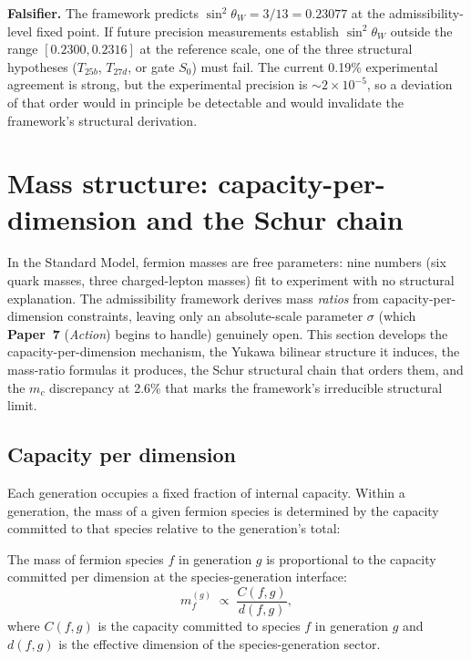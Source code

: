 \documentclass[11pt]{article}
\newcommand{\epitag}[1]{\textbf{[#1]}}
\newcommand{\paperref}[2]{\textbf{Paper~#1} (\textit{#2})}
\theoremstyle{definition}
\begin{document}
\textbf{Falsifier.} The framework predicts $\sin^2\theta_W = 3/13 = 0.23077$ at the admissibility-level fixed point. If future precision measurements establish $\sin^2\theta_W$ outside the range $[0.2300, 0.2316]$ at the reference scale, one of the three structural hypotheses ($T_{25b}$, $T_{27d}$, or gate $S_0$) must fail. The current 0.19\% experimental agreement is strong, but the experimental precision is $\sim 2 \times 10^{-5}$, so a deviation of that order would in principle be detectable and would invalidate the framework's structural derivation.

\section{Mass structure: capacity-per-dimension and the Schur chain}\label{sec:mass_structure}

In the Standard Model, fermion masses are free parameters: nine numbers (six quark masses, three charged-lepton masses) fit to experiment with no structural explanation. The admissibility framework derives mass \emph{ratios} from capacity-per-dimension constraints, leaving only an absolute-scale parameter $\sigma$ (which \paperref{7}{Action} begins to handle) genuinely open. This section develops the capacity-per-dimension mechanism, the Yukawa bilinear structure it induces, the mass-ratio formulas it produces, the Schur structural chain that orders them, and the $m_c$ discrepancy at 2.6\% that marks the framework's irreducible structural limit.

\subsection{Capacity per dimension}\label{sec:capacity_per_dim}

Each generation occupies a fixed fraction of internal capacity. Within a generation, the mass of a given fermion species is determined by the capacity committed to that species relative to the generation's total:

\begin{tcolorbox}[apfbox, title={$L_{\mathrm{capacity\_per\_dimension}}$ \epitag{P\_structural}}]
The mass of fermion species $f$ in generation $g$ is proportional to the capacity committed per dimension at the species-generation interface:
\[
m_f^{(g)} \;\propto\; \frac{C(f, g)}{d(f, g)},
\]
where $C(f, g)$ is the capacity committed to species $f$ in generation $g$ and $d(f, g)$ is the effective dimension of the species-generation sector.
\end{tcolorbox}
\end{document}
